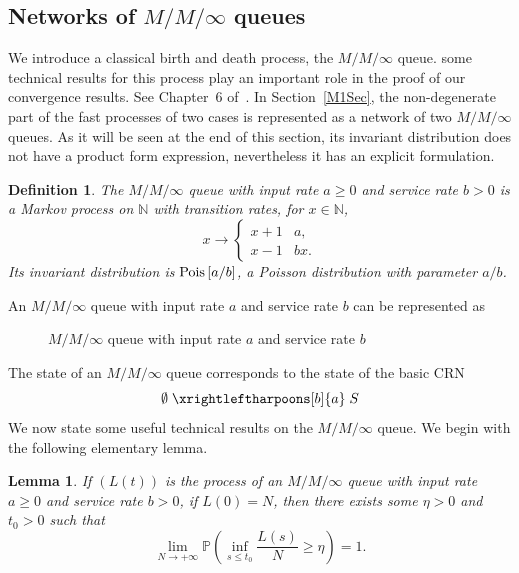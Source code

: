 \documentclass[english]{amsart}
\newcommand{\N}{\ensuremath{\mathbb{N}}}
\renewcommand{\P}{\ensuremath{\mathbb{P}}}
\newcommand\Pois[1]{{\rm Pois}\left[#1\right]}
\newtheorem{definition}[proposition]{Definition}
\newtheorem{lemma}[proposition]{Lemma}
\numberwithin{proposition}{section}
\begin{document}
\subsection{Networks of $M/M/\infty$ queues}\label{MMISec}
We introduce a classical birth and death process, the $M/M/\infty$ queue.  some technical results for this process play an important role in the proof of our convergence results.  See Chapter~6 of~\citet{Robert}. In Section~\ref{M1Sec}, the non-degenerate part of the fast processes of two cases is represented as a network of two $M/M/\infty$ queues. As it will be seen at the end of this section, its invariant distribution does not have a product form expression, nevertheless it has an explicit formulation. 
\begin{definition}\label{defMMI}
The ${M/M/\infty}$ queue with input rate $a{\ge}0$ and service rate $b{>}0$ is a  Markov process  on $\N$ with transition rates, for $x{\in}\N$,
\[
x\longrightarrow
\begin{cases}
x{+}1&   a,\\
x{-}1&   b x.
\end{cases}
\]
Its invariant distribution is $\Pois{a/b}$, a Poisson distribution with parameter $a/b$.
\end{definition}
An ${M/M/\infty}$ queue with input rate $a$ and service rate $b$ can be represented as
\begin{center}
\begin{figure}[h]
\caption{$M/M/\infty$ queue with input rate $a$ and service rate $b$}\label{FigF0}
\end{figure}
\end{center}
The state of an $M/M/\infty$ queue corresponds to the state of the  basic CRN
\[
\emptyset\mathrel{\mathop{\xrightleftharpoons[b]{a}}} {S}
\]
We now state some useful technical results on the $M/M/\infty$ queue. We begin with the following elementary lemma. 
\begin{lemma}\label{MMILower}
  If $(L(t))$ is the process of an ${M/M/\infty}$ queue with input rate $a{\ge}0$ and service rate $b{>}0$, if $L(0){=}N$, then there exists some $\eta{>}0$ and $t_0{>}0  $ such that
\begin{equation}\label{EqLemMMI}
\lim_{N\to+\infty} \P\left(\inf_{s\leq t_0}\frac{L(s)}{N}\ge \eta \right)=1.
\end{equation}
\end{lemma}
\end{document}
